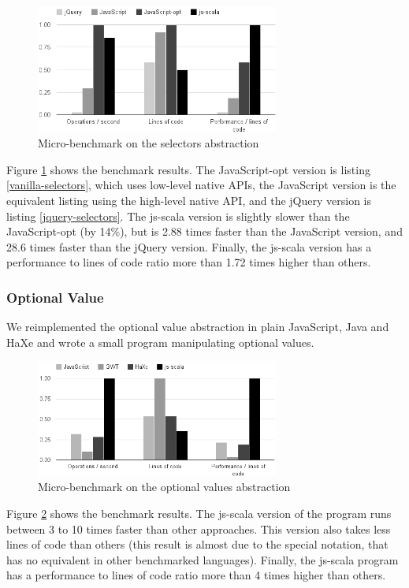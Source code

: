 \documentclass[preprint]{sigplanconf}
\begin{document}
\begin{figure}
\centering
\includegraphics[width=8cm]{selectors-benchmark.png}
\caption{Micro-benchmark on the selectors abstraction}
\label{fig:selectors-benchmark}
\end{figure}

Figure \ref{fig:selectors-benchmark} shows the benchmark results. The JavaScript-opt version is
listing \ref{vanilla-selectors}, which uses low-level native APIs, the JavaScript version is the
equivalent listing using the high-level native API, and the jQuery version is listing
\ref{jquery-selectors}. The js-scala version is slightly slower than the JavaScript-opt (by 14\%),
but is 2.88 times faster than the JavaScript version, and 28.6 times faster than the jQuery
version. Finally, the js-scala version has a performance to lines of code ratio more than 1.72
times higher than others.

\subsubsection{Optional Value}

We reimplemented the optional value abstraction in plain JavaScript, Java and HaXe and wrote a small
program manipulating optional values.

\begin{figure}
\centering
\includegraphics[width=8cm]{microbenchmark.png}
\caption{Micro-benchmark on the optional values abstraction}
\label{micro-benchmark}
\end{figure}

Figure \ref{micro-benchmark} shows the benchmark results. The js-scala version of the program runs
between 3 to 10 times faster than other approaches. This version also takes less lines of code than
others (this result is almost due to the special  notation, that has no equivalent in
other benchmarked languages). Finally, the js-scala program has a performance to lines of code ratio
more than 4 times higher than others.
\end{document}

